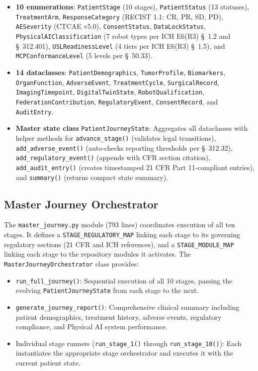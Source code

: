 \documentclass{article}
\begin{document}
\begin{itemize}[leftmargin=*]
\item \textbf{10 enumerations}: \texttt{PatientStage} (10 stages), \texttt{PatientStatus} (13 statuses), \texttt{TreatmentArm}, \texttt{ResponseCategory} (RECIST 1.1: CR, PR, SD, PD), \texttt{AESeverity} (CTCAE v5.0), \texttt{ConsentStatus}, \texttt{DataLockStatus}, \texttt{PhysicalAIClassification} (7 robot types per ICH E6(R3) \S~1.2 and \S~312.401), \texttt{USLReadinessLevel} (4 tiers per ICH E6(R3) \S~1.5), and \texttt{MCPConformanceLevel} (5 levels per \S~50.33).

\item \textbf{14 dataclasses}: \texttt{PatientDemographics}, \texttt{TumorProfile}, \texttt{Biomarkers}, \texttt{OrganFunction}, \texttt{AdverseEvent}, \texttt{TreatmentCycle}, \texttt{SurgicalRecord}, \texttt{ImagingTimepoint}, \texttt{DigitalTwinState}, \texttt{RobotQualification}, \texttt{FederationContribution}, \texttt{RegulatoryEvent}, \texttt{ConsentRecord}, and \texttt{AuditEntry}.

\item \textbf{Master state class} \texttt{PatientJourneyState}: Aggregates all dataclasses with helper methods for \texttt{advance\_stage()} (validates legal transitions), \texttt{add\_adverse\_event()} (auto-checks reporting thresholds per \S~312.32), \texttt{add\_regulatory\_event()} (appends with CFR section citation), \texttt{add\_audit\_entry()} (creates timestamped 21 CFR Part 11-compliant entries), and \texttt{summary()} (returns compact state summary).
\end{itemize}

\subsection{Master Journey Orchestrator}

The \texttt{master\_journey.py} module (793 lines) coordinates execution of all ten stages. It defines a \texttt{STAGE\_REGULATORY\_MAP} linking each stage to its governing regulatory sections (21 CFR and ICH references), and a \texttt{STAGE\_MODULE\_MAP} linking each stage to the repository modules it activates. The \texttt{MasterJourneyOrchestrator} class provides:

\begin{itemize}[leftmargin=*]
\item \texttt{run\_full\_journey()}: Sequential execution of all 10 stages, passing the evolving \texttt{PatientJourneyState} from each stage to the next.
\item \texttt{generate\_journey\_report()}: Comprehensive clinical summary including patient demographics, treatment history, adverse events, regulatory compliance, and Physical AI system performance.
\item Individual stage runners (\texttt{run\_stage\_1()} through \texttt{run\_stage\_10()}): Each instantiates the appropriate stage orchestrator and executes it with the current patient state.
\end{itemize}
\end{document}
